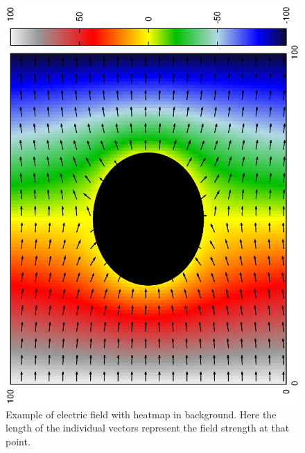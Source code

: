 \documentclass[aps,twocolumn,pre,nofootinbib,10pt]{revtex4-1}
\begin{document}
\begin{figure}[h]
\begin{center}
\includegraphics[height=\breite \columnwidth,angle=-90]{efield.ps}
\caption{Example of electric field with heatmap in background. Here the length of the individual vectors represent the field strength at that point.}
\label{efield}
\end{center}
\end{figure}

\clearpage
\end{document}
